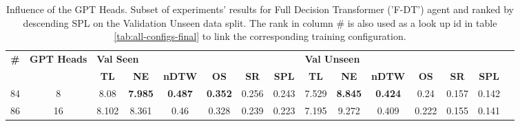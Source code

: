 \begin{table}
\centering
\caption{\label{tab:f_dt_heads}Influence of the GPT Heads. Subset of experiments' results for Full Decision Transformer ('F-DT') agent and ranked by descending SPL on the Validation Unseen data split. The rank in column \# is also used as a look up id in table \ref{tab:all-configs-final} to link the corresponding training configuration.}
\begin{tabular}{@{\hskip3pt}c@{\hskip3pt}c@{\hskip3pt}c@{\hskip3pt}c@{\hskip3pt}c@{\hskip3pt}c@{\hskip3pt}c@{\hskip3pt}c@{\hskip3pt}c@{\hskip3pt}c@{\hskip3pt}c@{\hskip3pt}c@{\hskip3pt}c@{\hskip3pt}c@{\hskip3pt}c}
\toprule
\textbf{\#} & \textbf{GPT Heads} & \multicolumn{6}{l}{\textbf{Val Seen}} & \multicolumn{6}{l}{\textbf{Val Unseen}} \\
 \textbf{~} &         \textbf{~} &       \textbf{TL} &     \textbf{NE} &   \textbf{nDTW} &     \textbf{OS} & \textbf{SR} & \textbf{SPL} &         \textbf{TL} &     \textbf{NE} &   \textbf{nDTW} & \textbf{OS} & \textbf{SR} & \textbf{SPL} \\
\midrule
         84 &                  8 &              8.08 &  \textbf{7.985} &  \textbf{0.487} &  \textbf{0.352} &       0.256 &        0.243 &               7.529 &  \textbf{8.845} &  \textbf{0.424} &        0.24 &       0.157 &        0.142 \\
         86 &                 16 &             8.102 &           8.361 &            0.46 &           0.328 &       0.239 &        0.223 &               7.195 &           9.272 &           0.409 &       0.222 &       0.155 &        0.141 \\
\bottomrule
\end{tabular}
\end{table}
